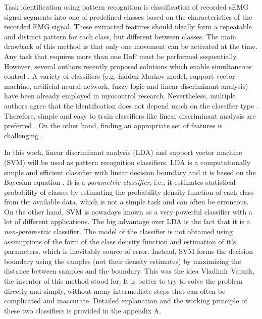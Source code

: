 Task identification using pattern recognition is classification of recorded sEMG signal segments into one of predefined classes based on the characteristics of the recorded EMG signal. These extracted features should ideally form a repeatable and distinct pattern for each class, but different between classes.  The main drawback of this method is that only one movement can be activated at the time. Any task that requires more than one DoF must be performed sequentially. However, several authors recently proposed solutions which enable simultaneous control \citep{Young2013, Kamavuako2013, Baker2010}. A variety of classifiers (e.g. hidden Markov model, support vector machine, artificial neural network, fuzzy logic and linear discriminant analysis) \citep{Oskoei2007} have been already employed in myocontrol research. Nevertheless, multiple authors agree that the identification does not depend much on the classifier type \citep{Hargrove2007, Zhang2012, Hakonen2015}. Therefore, simple and easy to train classifiers like linear discriminant analysis are preferred \citep{Li2010, Englehart1999, Tkach2010, Li2014, Hakonen2015}. On the other hand, finding an appropriate set of features is challenging \citep{Englehart1999, Tkach2010, Liu2013}.

In this work, linear discriminant analysis (LDA) and support vector machine (SVM) will be used as pattern recognition classifiers. LDA is a computationally simple and efficient classifier with linear decision boundary and it is based on the Bayesian equation \citep{McLachlan2004}. It is a \emph{parametric classifier}, i.e., it estimates statistical probability of classes by estimating the probability density function of each class from the available data, which is not a simple task and can often be erroneous. On the other hand, SVM \citep{Cortes1995} is nowadays known as a very powerful classifier with a lot of different applications. The big advantage over LDA is the fact that it is a \emph{non-parametric} classifier. The model of the classifier is not obtained using assumptions of the form of the class density function and estimation of it's parameters, which is inevitably source of error. Instead, SVM forms the decision boundary using the samples (not their density estimates) by maximizing the distance between samples and the boundary. This was the idea Vladimir Vapnik, the inventor of this method stood for. It is better to try to solve the problem directly and simply, without many intermediate steps that can often be complicated and inaccurate. Detailed explanation and the working principle of these two classifiers is provided in the appendix A.

